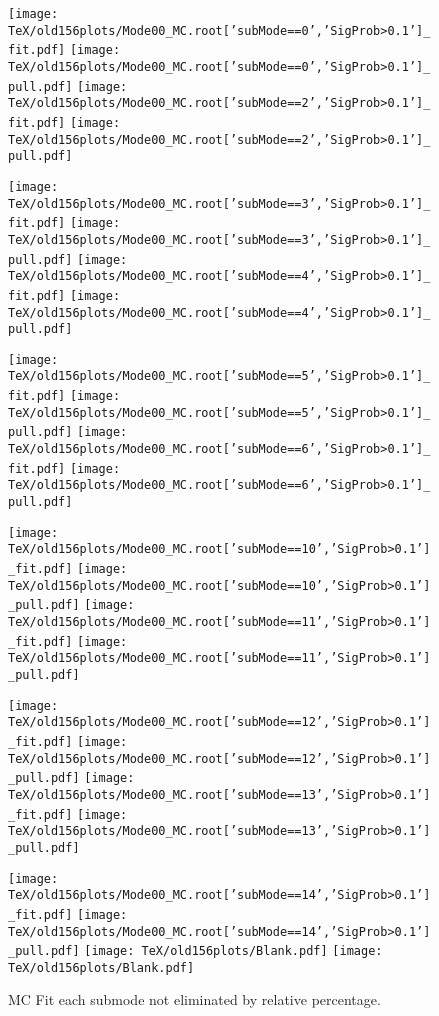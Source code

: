 \documentclass{article}
\begin{document}
\begin{figure}[h!]
\begin{center}

\texttt{[image: TeX/old156plots/Mode00\_MC.root['subMode==0','SigProb>0.1']\_fit.pdf]}
\texttt{[image: TeX/old156plots/Mode00\_MC.root['subMode==0','SigProb>0.1']\_pull.pdf]}
\texttt{[image: TeX/old156plots/Mode00\_MC.root['subMode==2','SigProb>0.1']\_fit.pdf]}
\texttt{[image: TeX/old156plots/Mode00\_MC.root['subMode==2','SigProb>0.1']\_pull.pdf]}

\texttt{[image: TeX/old156plots/Mode00\_MC.root['subMode==3','SigProb>0.1']\_fit.pdf]}
\texttt{[image: TeX/old156plots/Mode00\_MC.root['subMode==3','SigProb>0.1']\_pull.pdf]}
\texttt{[image: TeX/old156plots/Mode00\_MC.root['subMode==4','SigProb>0.1']\_fit.pdf]}
\texttt{[image: TeX/old156plots/Mode00\_MC.root['subMode==4','SigProb>0.1']\_pull.pdf]}

\texttt{[image: TeX/old156plots/Mode00\_MC.root['subMode==5','SigProb>0.1']\_fit.pdf]}
\texttt{[image: TeX/old156plots/Mode00\_MC.root['subMode==5','SigProb>0.1']\_pull.pdf]}
\texttt{[image: TeX/old156plots/Mode00\_MC.root['subMode==6','SigProb>0.1']\_fit.pdf]}
\texttt{[image: TeX/old156plots/Mode00\_MC.root['subMode==6','SigProb>0.1']\_pull.pdf]}

\texttt{[image: TeX/old156plots/Mode00\_MC.root['subMode==10','SigProb>0.1']\_fit.pdf]}
\texttt{[image: TeX/old156plots/Mode00\_MC.root['subMode==10','SigProb>0.1']\_pull.pdf]}
\texttt{[image: TeX/old156plots/Mode00\_MC.root['subMode==11','SigProb>0.1']\_fit.pdf]}
\texttt{[image: TeX/old156plots/Mode00\_MC.root['subMode==11','SigProb>0.1']\_pull.pdf]}

\texttt{[image: TeX/old156plots/Mode00\_MC.root['subMode==12','SigProb>0.1']\_fit.pdf]}
\texttt{[image: TeX/old156plots/Mode00\_MC.root['subMode==12','SigProb>0.1']\_pull.pdf]}
\texttt{[image: TeX/old156plots/Mode00\_MC.root['subMode==13','SigProb>0.1']\_fit.pdf]}
\texttt{[image: TeX/old156plots/Mode00\_MC.root['subMode==13','SigProb>0.1']\_pull.pdf]}

\texttt{[image: TeX/old156plots/Mode00\_MC.root['subMode==14','SigProb>0.1']\_fit.pdf]}
\texttt{[image: TeX/old156plots/Mode00\_MC.root['subMode==14','SigProb>0.1']\_pull.pdf]}
\texttt{[image: TeX/old156plots/Blank.pdf]}
\texttt{[image: TeX/old156plots/Blank.pdf]}

\caption{MC Fit each submode not eliminated by relative percentage.}
\label{fig:subFit}
\end{center}
\end{figure}
\end{document}
